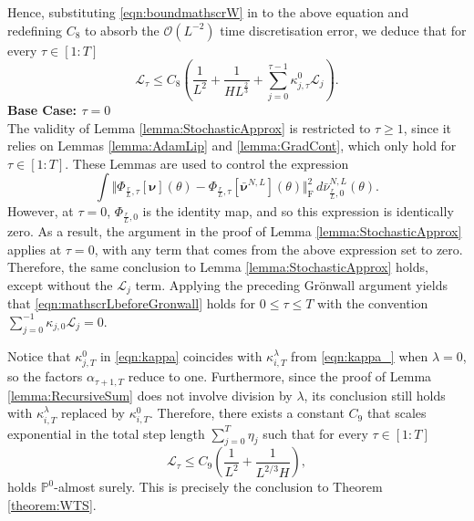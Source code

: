 \documentclass{article}
\begin{document}
\begin{appendices}
\[\]
Hence, substituting \eqref{eqn:boundmathscrW} in to the above equation and redefining $C_8$ to absorb the $\mathcal O(L^{-2})$ time discretisation error, we deduce that for every $\tau\in [1:T]$ 
\begin{equation}\label{eqn:mathscrLbeforeGronwall}
    \mathscr{L}_{\tau}\le C_8\left(\frac{1}{L^2}+\frac{1}{HL^{\frac{2}{3}}}+\sum_{j=0}^{\tau-1}\kappa^0_{j,\tau}\mathscr{L}_j\right).
\end{equation}
\textbf{Base Case: $\tau=0$}\\
The validity of Lemma \ref{lemma:StochasticApprox} is restricted to $\tau \ge 1$, since it relies on Lemmas \ref{lemma:AdamLip} and \ref{lemma:GradCont}, which only hold for $\tau \in[1:T]$. These Lemmas are used to control the expression
\[
\int \Vert \Phi_{\frac{r}{L},\tau}[\bm\nu](\theta)-\Phi_{\frac{r}{L},\tau}[\bm{\bar\nu}^{N,L}](\theta)\Vert_\mathrm{F}^2 \,d\bar\nu^{N,L}_{\frac{r}{L},0}(\theta).
\]
However, at $\tau=0$, $\Phi_{\frac{r}{L},0}$ is the identity map, and so this expression is identically zero. As a result, the argument in the proof of Lemma \ref{lemma:StochasticApprox} applies at $\tau=0$, with any term that comes from the above expression set to zero. Therefore, the same conclusion to Lemma \ref{lemma:StochasticApprox} holds, except without the $\mathscr{L}_j$ term. Applying the preceding Gr\"onwall argument yields that \eqref{eqn:mathscrLbeforeGronwall} holds for $0\le \tau\le T$ with the convention $\sum_{j=0}^{-1}\kappa_{j,0}\mathscr{L}_j=0$.

Notice that $\kappa^0_{j,T}$ in \eqref{eqn:kappa} coincides with $\kappa^\lambda_{i,T}$ from \eqref{eqn:kappa_} when $\lambda=0$, so the factors $\alpha_{\tau+1,T}$ reduce to one. Furthermore, since the proof of Lemma \ref{lemma:RecursiveSum} does not involve division by $\lambda$, its conclusion still holds with $\kappa^\lambda_{i,T}$ replaced by $\kappa^0_{i,T}$. Therefore, there exists a constant $C_9$ that scales exponential in the total step length $\sum_{j=0}^T\eta_j$ such that for every $\tau\in[1:T]$
\begin{equation}\label{eqn:boundmathscrL}
    \mathscr{L}_\tau \le C_9\left( \frac{1}{L^2}+ \frac{1}{L^{2/3}H}\right),
\end{equation}
holds $\mathbb P^0$-almost surely. This is precisely the conclusion to Theorem \ref{theorem:WTS}.\\


\end{appendices}
\end{document}
